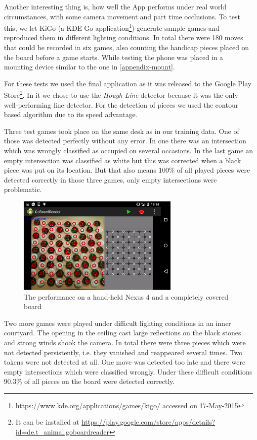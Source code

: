 	Another interesting thing is, how well the App performs under real world circumstances, with some camera movement and part time occlusions. To test this, we let KiGo (a KDE Go application\footnote{\url{https://www.kde.org/applications/games/kigo/} accessed on 17-May-2015}) generate sample games and reproduced them in different lighting conditions. In total there were 180 moves that could be recorded in six games, also counting the handicap pieces placed on the board before a game starts. While testing the phone was placed in a mounting device similar to the one in \autoref{appendix-mount}.

	For these tests we used the final application as it was released to the Google Play Store\footnote{It can be installed at \url{https://play.google.com/store/apps/details?id=de.t_animal.goboardreader}}. In it we chose to use the \emph{Hough Line} detector because it was the only well-performing line detector. For the detection of pieces we used the contour based algorithm due to its speed advantage.

	Three test games took place on the same desk as in our training data. One of those was detected perfectly without any error. In one there was an intersection which was wrongly classified as occupied on several occasions. In the last game an empty intersection was classified as white but this was corrected when a black piece was put on its location. But that also means 100\% of all played pieces were detected correctly in those three games, only empty intersections were problematic.

	\begin{figure}
		\center
		\includegraphics[width=0.7\textwidth]{images/android_perfect_recognition.png}
		\caption{The performance on a hand-held Nexus 4 and a completely covered board}
		\label{fig:android_perfect_recognition}
	\end{figure}
	Two more games were played under difficult lighting conditions in an inner courtyard. The opening in the ceiling cast large reflections on the black stones and strong winds shook the camera. In total there were three pieces which were not detected persistently, i.e. they vanished and reappeared several times. Two tokens were not detected at all. One move was detected too late and there were empty intersections which were classified wrongly. Under these difficult conditions 90.3\% of all pieces on the board were detected correctly.


